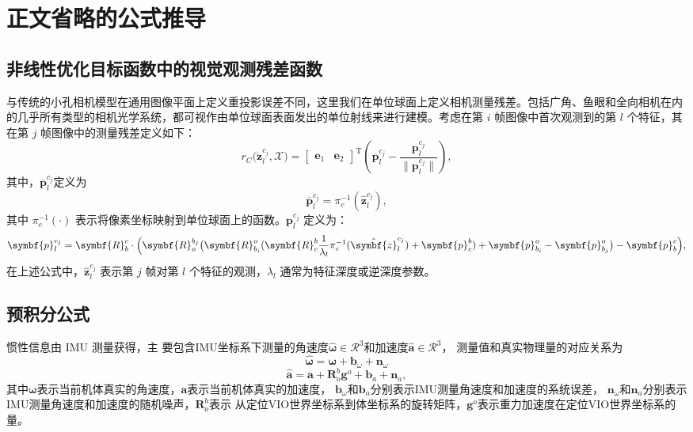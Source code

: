 
\chapter{正文省略的公式推导}

\section{非线性优化目标函数中的视觉观测残差函数}
\label{appendix:nonlinear_optimization}

与传统的小孔相机模型在通用图像平面上定义重投影误差不同，这里我们在单位球面上定义相机测量残差。包括广角、鱼眼和全向相机在内的几乎所有类型的相机光学系统，都可视作由单位球面表面发出的单位射线来进行建模。考虑在第 $i$ 帧图像中首次观测到的第 $l$ 个特征，其在第 $j$ 帧图像中的测量残差定义如下：
\begin{equation}
r_{C}\bigl(\hat{\symbf{z}}_l^{c_j}, \mathcal{X}\bigr) 
= 
\begin{bmatrix}
\symbf{e}_1 & \symbf{e}_2
\end{bmatrix}^\mathrm{T}
\left(
  \overline{\symbf{p}}_l^{c_j} - \frac{\symbf{p}_l^{c_j}}{\bigl\|\symbf{p}_l^{c_j}\bigr\|}
\right),
\end{equation}
其中，$\overline{\symbf{p}}_l^{c_j}$定义为
\begin{equation}
\overline{\symbf{p}}_l^{c_j} = \pi_c^{-1}(\hat{\symbf{z}}_l^{c_j}),
\end{equation}
其中 $\pi_c^{-1}(\cdot)$ 表示将像素坐标映射到单位球面上的函数。$\symbf{p}_l^{c_j}$ 定义为：
\begin{equation}
\symbf{p}_l^{c_j} = \symbf{R}_b^c \cdot
\Bigl( 
  \symbf{R}_{o}^{b_j}
  \bigl( 
    \symbf{R}_{b_i}^{o}
    (
      \symbf{R}_c^{b} \frac{1}{\lambda_l}\pi_c^{-1}(\hat{\symbf{z}}_l^{c_j}) + \symbf{p}_c^b
    ) + \symbf{p}_{b_i}^{o} - \symbf{p}^{o}_{b_j}
  \bigr) - \symbf{p}_{b}^{c}
\Bigr),
\end{equation}
在上述公式中，$\hat{\symbf{z}}_l^{c_j}$ 表示第 $j$ 帧对第 $l$ 个特征的观测，$\lambda_l$ 通常为特征深度或逆深度参数。


\section{预积分公式}
\label{appendix:preintegration}
惯性信息由 IMU 测量获得，主
要包含IMU坐标系下测量的角速度$\hat{\symbf{\omega}}\in\mathcal{R}^3$和加速度$\hat{\symbf{a}}\in\mathcal{R}^3$，
测量值和真实物理量的对应关系为
\begin{equation}
    \hat{\symbf{\omega}} = \symbf{\omega} + \symbf{b}_{\omega} + \symbf{n}_{\omega}
\end{equation}
\begin{equation}
  \hat{\symbf{a}} = \symbf{a} + \symbf{R}_o^b \symbf{g}^o + \symbf{b}_a + \symbf{n}_{a},
\end{equation}
其中$\symbf{\omega}$表示当前机体真实的角速度，$\symbf{a}$表示当前机体真实的加速度，
$\symbf{b}_{\omega}$和$\symbf{b}_a$分别表示IMU测量角速度和加速度的系统误差，
$\symbf{n}_{\omega}$和$\symbf{n}_{a}$分别表示IMU测量角速度和加速度的随机噪声，$\symbf{R}_o^b$表示
从定位VIO世界坐标系到体坐标系的旋转矩阵，$\symbf{g}^o$表示重力加速度在定位VIO世界坐标系的量。

